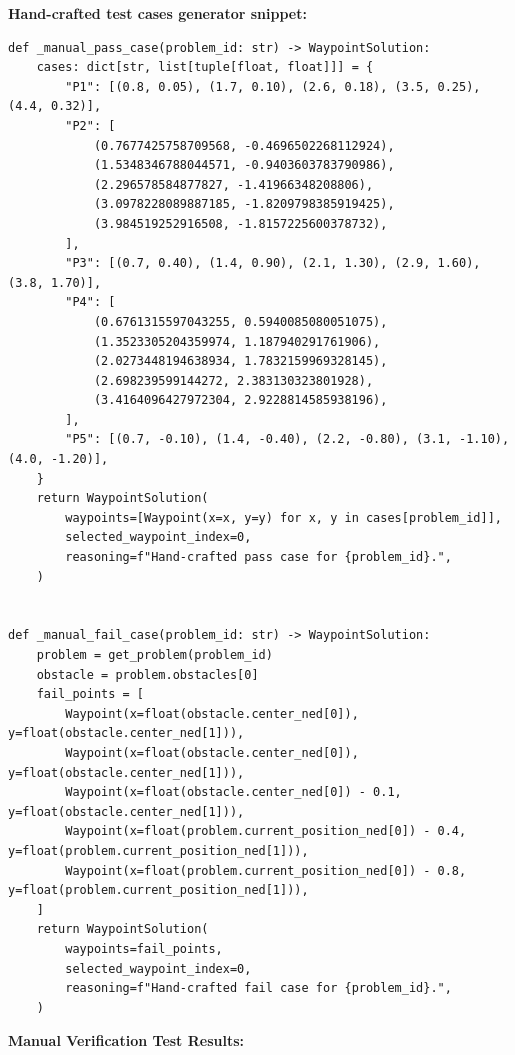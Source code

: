 \documentclass[12pt]{article}
\begin{document}
\bigskip
\noindent\textbf{ Hand-crafted test cases generator snippet:}
\begin{lstlisting}[style=pycode]
def _manual_pass_case(problem_id: str) -> WaypointSolution:
    cases: dict[str, list[tuple[float, float]]] = {
        "P1": [(0.8, 0.05), (1.7, 0.10), (2.6, 0.18), (3.5, 0.25), (4.4, 0.32)],
        "P2": [
            (0.7677425758709568, -0.4696502268112924),
            (1.5348346788044571, -0.9403603783790986),
            (2.296578584877827, -1.41966348208806),
            (3.0978228089887185, -1.8209798385919425),
            (3.984519252916508, -1.8157225600378732),
        ],
        "P3": [(0.7, 0.40), (1.4, 0.90), (2.1, 1.30), (2.9, 1.60), (3.8, 1.70)],
        "P4": [
            (0.6761315597043255, 0.5940085080051075),
            (1.3523305204359974, 1.187940291761906),
            (2.0273448194638934, 1.7832159969328145),
            (2.698239599144272, 2.383130323801928),
            (3.4164096427972304, 2.9228814585938196),
        ],
        "P5": [(0.7, -0.10), (1.4, -0.40), (2.2, -0.80), (3.1, -1.10), (4.0, -1.20)],
    }
    return WaypointSolution(
        waypoints=[Waypoint(x=x, y=y) for x, y in cases[problem_id]],
        selected_waypoint_index=0,
        reasoning=f"Hand-crafted pass case for {problem_id}.",
    )


def _manual_fail_case(problem_id: str) -> WaypointSolution:
    problem = get_problem(problem_id)
    obstacle = problem.obstacles[0]
    fail_points = [
        Waypoint(x=float(obstacle.center_ned[0]), y=float(obstacle.center_ned[1])),
        Waypoint(x=float(obstacle.center_ned[0]), y=float(obstacle.center_ned[1])),
        Waypoint(x=float(obstacle.center_ned[0]) - 0.1, y=float(obstacle.center_ned[1])),
        Waypoint(x=float(problem.current_position_ned[0]) - 0.4, y=float(problem.current_position_ned[1])),
        Waypoint(x=float(problem.current_position_ned[0]) - 0.8, y=float(problem.current_position_ned[1])),
    ]
    return WaypointSolution(
        waypoints=fail_points,
        selected_waypoint_index=0,
        reasoning=f"Hand-crafted fail case for {problem_id}.",
    )

\end{lstlisting}

\bigskip
\textbf{Manual Verification Test Results:}
\end{document}
